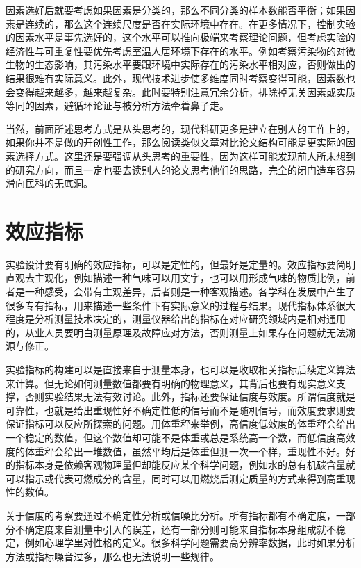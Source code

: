 \documentclass[]{tufte-book}
\begin{document}
因素选好后就要考虑如果因素是分类的，那么不同分类的样本数能否平衡；如果因素是连续的，那么这个连续尺度是否在实际环境中存在。在更多情况下，控制实验的因素水平是事先选好的，这个水平可以推向极端来考察理论问题，但考虑实验的经济性与可重复性要优先考虑室温人居环境下存在的水平。例如考察污染物的对微生物的生态影响，其污染水平要跟环境中实际存在的污染水平相对应，否则做出的结果很难有实际意义。此外，现代技术进步使多维度同时考察变得可能，因素数也会变得越来越多，越来越复杂。此时要特别注意冗余分析，排除掉无关因素或实质等同的因素，避循环论证与被分析方法牵着鼻子走。

当然，前面所述思考方式是从头思考的，现代科研更多是建立在别人的工作上的，如果你并不是做的开创性工作，那么阅读类似文章对比论文结构可能是更实际的因素选择方式。这里还是要强调从头思考的重要性，因为这样可能发现前人所未想到的研究方向，而且一定也要去读别人的论文思考他们的思路，完全的闭门造车容易滑向民科的无底洞。

\hypertarget{ux6548ux5e94ux6307ux6807}{%
\section{效应指标}\label{ux6548ux5e94ux6307ux6807}}

实验设计要有明确的效应指标，可以是定性的，但最好是定量的。效应指标要简明直观去主观化，例如描述一种气味可以用文字，也可以用形成气味的物质比例，前者是一种感受，会带有主观差异，后者则是一种客观描述。各学科在发展中产生了很多专有指标，用来描述一些条件下有实际意义的过程与结果。现代指标体系很大程度是分析测量技术决定的，测量仪器给出的指标在对应研究领域内是相对通用的，从业人员要明白测量原理及故障应对方法，否则测量上如果存在问题就无法溯源与修正。

实验指标的构建可以是直接来自于测量本身，也可以是收取相关指标后续定义算法来计算。但无论如何测量数值都要有明确的物理意义，其背后也要有现实意义支撑，否则实验结果无法有效讨论。此外，指标还要保证信度与效度。所谓信度就是可靠性，也就是给出重现性好不确定性低的信号而不是随机信号，而效度要求则要保证指标可以反应所探索的问题。用体重秤来举例，高信度低效度的体重秤会给出一个稳定的数值，但这个数值却可能不是体重或总是系统高一个数，而低信度高效度的体重秤会给出一堆数值，虽然平均后是体重但测一次一个样，重现性不好。好的指标本身是依赖客观物理量但却能反应某个科学问题，例如水的总有机碳含量就可以指示或代表可燃成分的含量，同时可以用燃烧后测定质量的方式来得到高重现性的数值。

关于信度的考察要通过不确定性分析或信噪比分析。所有指标都有不确定度，一部分不确定度来自测量中引入的误差，还有一部分则可能来自指标本身组成就不稳定，例如心理学里对性格的定义。很多科学问题需要高分辨率数据，此时如果分析方法或指标噪音过多，那么也无法说明一些规律。
\end{document}
